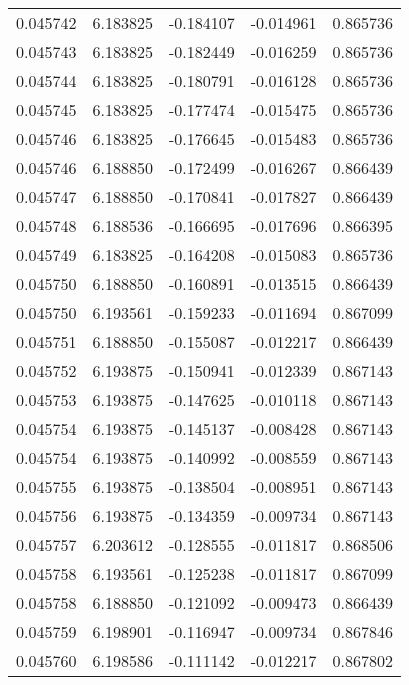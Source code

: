 \begin{tabular}{lrrrr}
0.045742    &  6.183825 & -0.184107 & -0.014961 &             0.865736 \\
0.045743    &  6.183825 & -0.182449 & -0.016259 &             0.865736 \\
0.045744    &  6.183825 & -0.180791 & -0.016128 &             0.865736 \\
0.045745    &  6.183825 & -0.177474 & -0.015475 &             0.865736 \\
0.045746    &  6.183825 & -0.176645 & -0.015483 &             0.865736 \\
0.045746    &  6.188850 & -0.172499 & -0.016267 &             0.866439 \\
0.045747    &  6.188850 & -0.170841 & -0.017827 &             0.866439 \\
0.045748    &  6.188536 & -0.166695 & -0.017696 &             0.866395 \\
0.045749    &  6.183825 & -0.164208 & -0.015083 &             0.865736 \\
0.045750    &  6.188850 & -0.160891 & -0.013515 &             0.866439 \\
0.045750    &  6.193561 & -0.159233 & -0.011694 &             0.867099 \\
0.045751    &  6.188850 & -0.155087 & -0.012217 &             0.866439 \\
0.045752    &  6.193875 & -0.150941 & -0.012339 &             0.867143 \\
0.045753    &  6.193875 & -0.147625 & -0.010118 &             0.867143 \\
0.045754    &  6.193875 & -0.145137 & -0.008428 &             0.867143 \\
0.045754    &  6.193875 & -0.140992 & -0.008559 &             0.867143 \\
0.045755    &  6.193875 & -0.138504 & -0.008951 &             0.867143 \\
0.045756    &  6.193875 & -0.134359 & -0.009734 &             0.867143 \\
0.045757    &  6.203612 & -0.128555 & -0.011817 &             0.868506 \\
0.045758    &  6.193561 & -0.125238 & -0.011817 &             0.867099 \\
0.045758    &  6.188850 & -0.121092 & -0.009473 &             0.866439 \\
0.045759    &  6.198901 & -0.116947 & -0.009734 &             0.867846 \\
0.045760    &  6.198586 & -0.111142 & -0.012217 &             0.867802 \\

\end{tabular}
